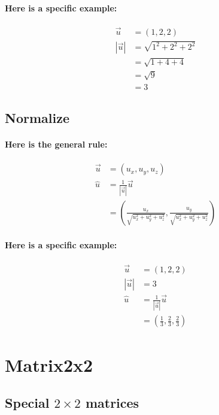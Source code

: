\documentclass[twoside]{article}
\begin{document}
\paragraph{Here is a specific example:}

\begin{align*}
  \vec{u} & = (1, 2, 2) \\
  |\vec{u}| & = \sqrt{ 1^2 + 2^2 + 2^2} \\
              & = \sqrt{1 + 4 + 4} \\
              & = \sqrt{ 9 } \\
              & = 3
  \end{align*}

\subsection{Normalize}

\paragraph{Here is the general rule:}

\begin{align*}
  \vec{u} & = (u_x, u_y, u_z) \\
  \hat{u} & = \frac{1}{|\vec{u}|} \vec{u} \\
            & = (\frac{u_x}{\sqrt{u_x^2 + u_y^2 + u_z^2}}, 
                    \frac{u_y}{\sqrt{u_x^2 + u_y^2 + u_z^2}})
  \end{align*}

\paragraph{Here is a specific example:}

\begin{align*}
  \vec{u} & = (1, 2, 2) \\
  |\vec{u}| & = 3 \\
  \hat{u} & = \frac{1}{|\vec{u}|} \vec{u} \\
            & = (\frac{1}{3}, \frac{2}{3}, \frac{2}{3})
  \end{align*}

\section{Matrix2x2}

\subsection{Special $2 \times 2$ matrices}
\end{document}
